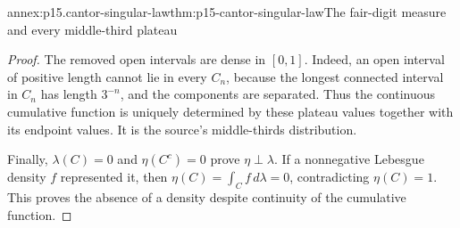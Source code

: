 \begin{annexitem}{annex:p15.cantor-singular-law}{thm:p15-cantor-singular-law}{The fair-digit measure and every middle-third plateau}
\begin{proof}
The removed open intervals are dense in \([0,1]\).
Indeed, an open interval of positive length cannot lie in every
\(C_n\), because the longest connected interval in \(C_n\) has
length \(3^{-n}\), and the components are separated.
Thus the continuous cumulative function is uniquely determined by
these plateau values together with its endpoint values.
It is the source's middle-thirds distribution.

Finally, \(\lambda(C)=0\) and \(\eta(C^c)=0\) prove
\(\eta\perp\lambda\).
If a nonnegative Lebesgue density \(f\) represented it, then
\(\eta(C)=\int_C f\,d\lambda=0\), contradicting \(\eta(C)=1\).
This proves the absence of a density despite continuity of the
cumulative function.
\end{proof}
\end{annexitem}


